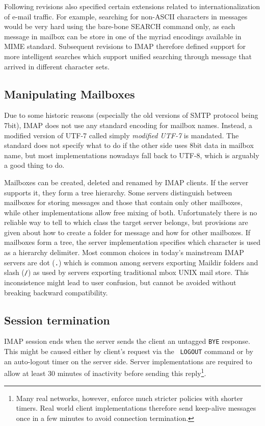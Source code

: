 \documentclass[12pt,notitlepage]{report}
\begin{document}
Following revisions also specified certain extensions related to
internationalization of e-mail traffic.  For example, searching for non-ASCII
characters in messages would be very hard using the bare-bone SEARCH command
only, as each message in mailbox can be store in one of the myriad encodings
available in MIME standard.  Subsequent revisions to IMAP therefore defined
support for more intelligent searches which support unified searching through
message that arrived in different character sets.

\subsection{Manipulating Mailboxes}

Due to some historic reasons (especially the old versions of SMTP protocol being
7bit), IMAP does not use any standard encoding for mailbox names.  Instead, a
modified version of UTF-7 called simply {\em modified UTF-7} is mandated.  The
standard does not specify what to do if the other side uses 8bit data in mailbox
name, but most implementations nowadays fall back to UTF-8, which is arguably a
good thing to do.

Mailboxes can be created, deleted and renamed by IMAP clients.  If the server
supports it, they form a tree hierarchy.  Some servers distinguish between
mailboxes for storing messages and those that contain only other mailboxes,
while other implementations allow free mixing of both.  Unfortunately there is
no reliable way to tell to which class the target server belongs, but provisions
are given about how to create a folder for message and how for other mailboxes.
If mailboxes form a tree, the server implementation specifies which character is
used as a hierarchy delimiter.  Most common choices in today's mainstream IMAP
servers are dot ({\tt .}) which is common among servers exporting Maildir
folders and slash ({\tt /}) as used by servers exporting traditional mbox UNIX
mail store.  This inconsistence might lead to user confusion, but cannot be
avoided without breaking backward compatibility.

\subsection{Session termination}

IMAP session ends when the server sends the client an untagged {\tt BYE}
response.  This might be caused either by client's request via the {\tt
LOGOUT} command or by an auto-logout timer on the server side.  Server
implementations are required to allow at least 30 minutes of inactivity before
sending this reply\footnote{Many real networks, however, enforce much stricter
policies with shorter timers.  Real world client implementations therefore send
keep-alive messages once in a few minutes to avoid connection termination.}.
\end{document}

